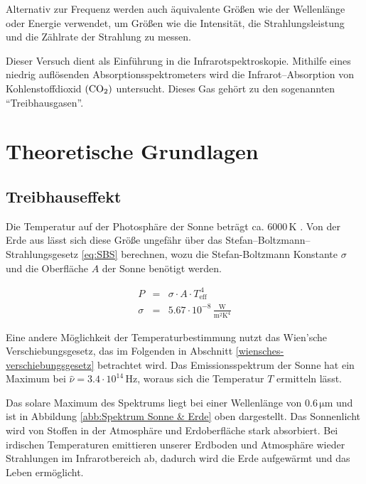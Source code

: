 \documentclass[12pt,a4paper]{scrartcl}
\numberwithin{equation}{section} %
\begin{document}
Alternativ zur Frequenz werden auch äquivalente Größen wie der Wellenlänge oder Energie verwendet, um Größen wie die Intensität, die Strahlungsleistung und die Zählrate der Strahlung zu messen.

Dieser Versuch dient als Einführung in die Infrarotspektroskopie. Mithilfe eines niedrig auflösenden Absorptionsspektrometers wird die Infrarot--Absorption von Kohlenstoffdioxid $(\ce{CO_2})$ untersucht. Dieses Gas gehört zu den sogenannten ``Treibhausgasen''.

\clearpage
\hypertarget{theoretische-grundlagen}{%
\section{Theoretische Grundlagen}\label{theoretische-grundlagen}}

\hypertarget{treibhauseffekt}{\subsection{Treibhauseffekt}\label{treibhauseffekt}}
Die Temperatur auf der Photosphäre der Sonne beträgt ca. $6000\mathrm{\,K}$ \cite{BakanRaschke}. Von der Erde aus lässt sich diese Größe ungefähr über das Stefan--Boltzmann--Strahlungsgesetz \eqref{eq:SBS} berechnen, wozu die Stefan-Boltzmann Konstante $\sigma$ und die Oberfläche $A$ der Sonne benötigt werden. \cite{Gerthsen}

\begin{eqnarray}
  P &=& \sigma \cdot A \cdot T_\mathrm{eff}^{\,4} \label{eq:SBS} \\
  \sigma &=& 5.67 \cdot 10^{-8} \mathrm{\,\frac{W}{m^2K^4}}
\end{eqnarray}

\noindent
Eine andere Möglichkeit der Temperaturbestimmung nutzt das Wien'sche Verschiebungsgesetz, das im Folgenden in Abschnitt \ref{wiensches-verschiebungsgesetz} betrachtet wird. Das Emissionsspektrum der Sonne hat ein Maximum bei $\hat \nu=3.4 \cdot 10^{14} \mathrm{\,Hz}$, woraus sich die Temperatur $T$ ermitteln lässt. \cite{Gerthsen}

Das solare Maximum des Spektrums liegt bei einer Wellenlänge von $0.6\mathrm{\,\mu m}$ und ist in Abbildung \ref{abb:Spektrum Sonne & Erde} oben dargestellt. Das Sonnenlicht wird von Stoffen in der Atmosphäre und Erdoberfläche stark absorbiert. Bei irdischen Temperaturen emittieren unserer Erdboden und Atmosphäre wieder Strahlungen im Infrarotbereich ab, dadurch wird die Erde aufgewärmt und das Leben ermöglicht. \cite{BakanRaschke}
\end{document}
